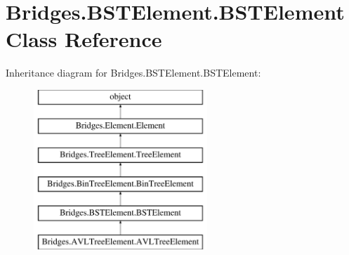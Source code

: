 \hypertarget{class_bridges_1_1_b_s_t_element_1_1_b_s_t_element}{}\section{Bridges.\+B\+S\+T\+Element.\+B\+S\+T\+Element Class Reference}
\label{class_bridges_1_1_b_s_t_element_1_1_b_s_t_element}
Inheritance diagram for Bridges.\+B\+S\+T\+Element.\+B\+S\+T\+Element\+:\begin{figure}[H]
\begin{center}
\leavevmode
\includegraphics[height=6.000000cm]{class_bridges_1_1_b_s_t_element_1_1_b_s_t_element}
\end{center}
\end{figure}

